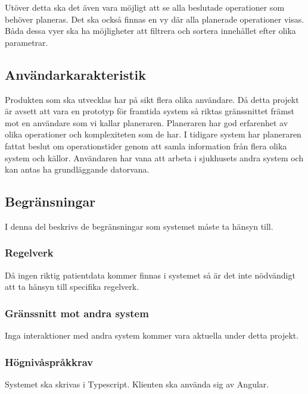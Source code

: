 \documentclass{article}
\begin{document}
Utöver detta ska det även vara möjligt att se alla beslutade operationer som
behöver planeras. Det ska också finnas en vy där alla planerade operationer
visas. Båda dessa vyer ska ha möjligheter att filtrera och sortera innehållet
efter olika parametrar.
\subsection{Användarkarakteristik}
\label{subsec:Andvandarkarateristik}
Produkten som ska utvecklas har på sikt flera olika användare. Då detta
projekt är avsett att vara en prototyp för framtida system så riktas
gränssnittet
främst mot en användare som vi kallar planeraren. Planeraren har god
erfarenhet av olika operationer och komplexiteten som de har. I tidigare system
har planeraren fattat beslut om operationstider genom att samla information
från flera olika system och källor. Användaren har vana att arbeta i
sjukhusets
andra system och kan antas ha grundläggande datorvana.

\subsection{Begränsningar}
\label{subsec:Begransningar}
I denna del beskrivs de begränsningar som systemet måste ta hänsyn till.

\subsubsection{Regelverk}
\label{subsec:Regelverk}
Då ingen riktig patientdata kommer finnas i systemet så är det inte nödvändigt
att ta hänsyn till specifika regelverk.

\subsubsection{Gränssnitt mot andra system}
\label{subsec:Granssnitt till andra system}
Inga interaktioner med andra system kommer vara aktuella under detta projekt.

\subsubsection{Högnivåspråkkrav}
\label{subsec:Hognivasprakkrav}
Systemet ska skrivas i Typescript. Klienten ska använda sig av Angular.

\end{document}
